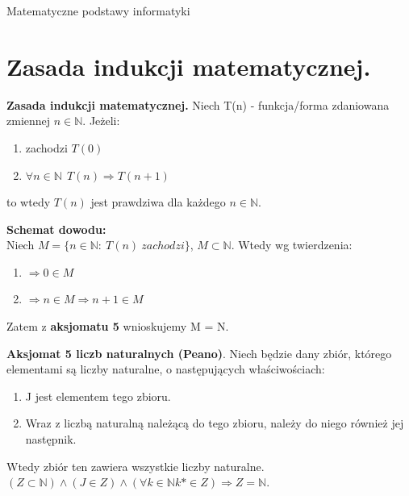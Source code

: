 \documentclass[12pt]{article}
\begin{document}
    \tableofcontents

    \newpage


    \begin{center}{\LARGE Matematyczne podstawy informatyki}\end{center}

    \section{Zasada indukcji matematycznej.}

    \begin{theorem}
        \textbf{Zasada indukcji matematycznej.} Niech T(n) - funkcja/forma zdaniowana zmiennej $n \in \mathbb{N}$. Jeżeli:
        \begin{enumerate}
            \item zachodzi $T(0)$
            \item $\forall n \in \mathbb{N} ~~ T(n) \Rightarrow  T(n+1)$
        \end{enumerate}
        to wtedy $T(n)$ jest prawdziwa dla każdego $n \in \mathbb{N}$.
    \end{theorem}

    \textbf{Schemat dowodu:}\\

    Niech $M = \{ n \in \mathbb{N}: ~ T(n) ~ zachodzi \}$, $M \subset \mathbb{N}$. Wtedy wg twierdzenia:
    \begin{enumerate}
        \item $\Rightarrow 0 \in M$
        \item $\Rightarrow n \in M \Rightarrow n+1 \in M$
    \end{enumerate}
    Zatem z \textbf{aksjomatu 5} wnioskujemy M = N.

    \begin{theorem}
        \textbf{Aksjomat 5 liczb naturalnych (Peano)}. Niech będzie dany zbiór, którego elementami są liczby
        naturalne, o następujących właściwościach:
        \begin{enumerate}
            \item J jest elementem tego zbioru.
            \item Wraz z liczbą naturalną należącą do tego zbioru, należy do niego również jej następnik.
        \end{enumerate}
        Wtedy zbiór ten zawiera wszystkie liczby naturalne.
        $(Z \subset \mathbb{N}) \wedge (J \in Z) \wedge (\forall k \in \mathbb{N} k* \in Z) \Rightarrow Z = \mathbb{N}$.
    \end{theorem}
\end{document}

